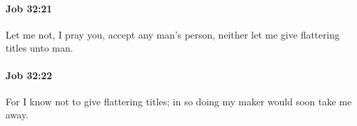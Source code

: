 		\paragraph{Job 32:21} %
			\label{JOB-32-21}

			Let me not, I pray you, accept any man’s person, neither let me give flattering titles unto man.


		\paragraph{Job 32:22} %
			\label{JOB-32-22}

			For I know not to give flattering titles; in so doing my maker would soon take me away.


